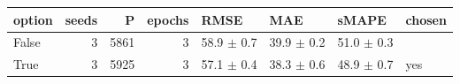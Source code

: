 \begin{tabular}{lrrrllll}
\toprule
option & seeds & P & epochs & RMSE & MAE & sMAPE & chosen \\
\midrule
False & 3 & 5861 & 3 & 58.9 $\pm$ 0.7 & 39.9 $\pm$ 0.2 & 51.0 $\pm$ 0.3 &  \\
True & 3 & 5925 & 3 & 57.1 $\pm$ 0.4 & 38.3 $\pm$ 0.6 & 48.9 $\pm$ 0.7 & yes \\
\bottomrule
\end{tabular}
